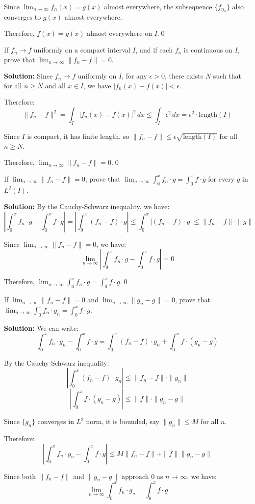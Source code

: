 Since $\lim_{n \to \infty} f_n(x) = g(x)$ almost everywhere, the subsequence $\{f_{n_k}\}$ also converges to $g(x)$ almost everywhere.

Therefore, $f(x) = g(x)$ almost everywhere on $I$.\qed


\begin{problembox}
If $f_n \to f$ uniformly on a compact interval $I$, and if each $f_n$ is continuous on $I$, prove that $\lim_{n \to \infty} \| f_n - f \| = 0$.
\end{problembox}

\noindent\textbf{Solution:}
Since $f_n \to f$ uniformly on $I$, for any $\epsilon > 0$, there exists $N$ such that for all $n \geq N$ and all $x \in I$, we have $|f_n(x) - f(x)| < \epsilon$.

Therefore:
\[\| f_n - f \|^2 = \int_I |f_n(x) - f(x)|^2 \, dx \leq \int_I \epsilon^2 \, dx = \epsilon^2 \cdot \text{length}(I)\]

Since $I$ is compact, it has finite length, so $\| f_n - f \| \leq \epsilon \sqrt{\text{length}(I)}$ for all $n \geq N$.

Therefore, $\lim_{n \to \infty} \| f_n - f \| = 0$.\qed


\begin{problembox}
If $\lim_{n \to \infty} \| f_n - f \| = 0$, prove that $\lim_{n \to \infty} \int_0^x f_n \cdot g = \int_0^x f \cdot g$ for every $g$ in $L^2(I)$.
\end{problembox}

\noindent\textbf{Solution:}
By the Cauchy-Schwarz inequality, we have:
\[\left|\int_0^x f_n \cdot g - \int_0^x f \cdot g\right| = \left|\int_0^x (f_n - f) \cdot g\right| \leq \int_0^x |(f_n - f) \cdot g| \leq \| f_n - f \| \cdot \| g \|\]

Since $\lim_{n \to \infty} \| f_n - f \| = 0$, we have:
\[\lim_{n \to \infty} \left|\int_0^x f_n \cdot g - \int_0^x f \cdot g\right| = 0\]

Therefore, $\lim_{n \to \infty} \int_0^x f_n \cdot g = \int_0^x f \cdot g$.\qed


\begin{problembox}
If $\lim_{n \to \infty} \| f_n - f \| = 0$ and $\lim_{n \to \infty} \| g_n - g \| = 0$, prove that $\lim_{n \to \infty} \int_0^x f_n \cdot g_n = \int_0^x f \cdot g$.
\end{problembox}

\noindent\textbf{Solution:}
We can write:
\[\int_0^x f_n \cdot g_n - \int_0^x f \cdot g = \int_0^x (f_n - f) \cdot g_n + \int_0^x f \cdot (g_n - g)\]

By the Cauchy-Schwarz inequality:
\[\left|\int_0^x (f_n - f) \cdot g_n\right| \leq \| f_n - f \| \cdot \| g_n \|\]
\[\left|\int_0^x f \cdot (g_n - g)\right| \leq \| f \| \cdot \| g_n - g \|\]

Since $\{g_n\}$ converges in $L^2$ norm, it is bounded, say $\| g_n \| \leq M$ for all $n$.

Therefore:
\[\left|\int_0^x f_n \cdot g_n - \int_0^x f \cdot g\right| \leq M \| f_n - f \| + \| f \| \| g_n - g \|\]

Since both $\| f_n - f \|$ and $\| g_n - g \|$ approach 0 as $n \to \infty$, we have:
\[\lim_{n \to \infty} \int_0^x f_n \cdot g_n = \int_0^x f \cdot g\]